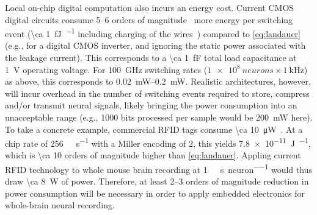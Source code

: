Local on-chip digital computation also incurs an energy cost.
Current CMOS digital circuits consume 5--6 orders of magnitude~\cite{tucker11,koomey11,yablonovitch08,tucker11b} more energy per switching event (\SI{\ca 1}{\femto\joule\per\bit} including charging of the wires~\cite{tucker11}) compared to \ref{eq:landauer} (e.g., for a digital CMOS inverter, and ignoring the static power associated with the leakage current).
This corresponds to a \SI{\ca 1}{\femto\farad} total load capacitance at \SI{1}{\volt} operating voltage. For \SI{100}{\giga\hertz} switching rates ($\SI{1e8}{neurons} \times \SI{1}{\kilo\hertz}$) as above, this corresponds to \SIrange{0.02}{0.2}{\milli\watt}.
Realistic architectures, however, will incur overhead in the number of switching events required to store, compress and/or transmit neural signals, likely bringing the power consumption into an unacceptable range (e.g., \num{1000} bits processed per sample would be \SI{200}{\milli\watt} here).
To take a concrete example, commercial RFID tags consume \SI{\ca 10}{\micro\watt}~\cite{rfidsheet}.
At a chip rate of \SI{256}{\kilo\bit\per\second} with a Miller encoding of 2, this yields \SI{7.8e-11}{\joule\per\bit}, which is \num{\ca 10} orders of magnitude higher than \ref{eq:landauer}.
Appling current RFID technology to whole mouse brain recording at \SI{1}{\kilo\bit\per\second\per neuron} would thus draw \SI{\ca 8}{\watt} of power.
Therefore, at least 2--3 orders of magnitude reduction in power consumption will be necessary in order to apply embedded electronics for whole-brain neural recording.

